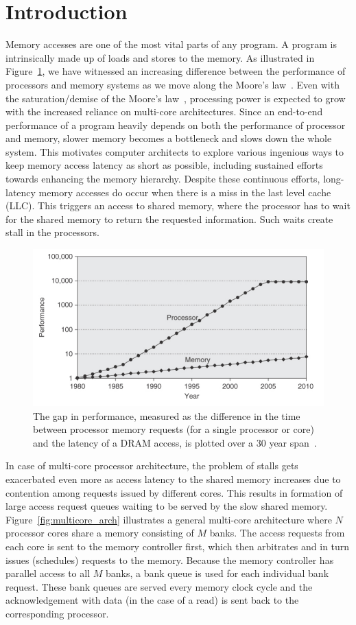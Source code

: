 \section{Introduction}
\label{sec:intro}
Memory accesses are one of the most vital parts of any program. A program is intrinsically made up of loads and stores to the memory. As illustrated in Figure~\ref{fig:cpuvsmemory}, we have witnessed an increasing difference between the performance of processors and memory systems as we move along the Moore's law~\cite{Wulf1995}.  Even with the saturation/demise of the Moore's law~\cite{waldrop2016, MooreMITR}, processing power is expected to grow with the increased reliance on multi-core architectures\cite{Geer}. Since an end-to-end performance of a program heavily depends on both the performance of processor and memory, slower memory becomes a bottleneck and slows down the whole system. {\color{red}This motivates computer architects to explore various ingenious ways to keep memory access latency as short as possible, including sustained efforts towards enhancing the memory hierarchy\cite{Burger}.} Despite these continuous efforts, long-latency memory accesses do occur when there is a miss in the last level cache (LLC). This triggers an access to shared memory, where the processor has to wait for the shared memory to return the requested information. Such waits create stall in the processors. 

\begin{figure}[t!]
\centering
\includegraphics[width=0.7\linewidth]{fig/cpuvsmemory.jpg}
\caption{The gap in performance, measured as the difference in the time 
between processor memory requests (for a single processor or core) and the 
latency of a DRAM access, is plotted over a $30$ year span~\cite{comparchbook}.}
\label{fig:cpuvsmemory}
\end{figure}
In case of multi-core processor architecture, the problem of stalls gets exacerbated even more as access latency to the 
shared memory increases due to contention among requests issued by different cores. This results in formation of large access request queues waiting to be served  by the slow shared memory. Figure~\ref{fig:multicore_arch}  illustrates a general multi-core 
architecture where $N$ processor cores share a memory consisting of $M$ banks. The access requests from each core is sent to the memory controller first, which then arbitrates and in turn issues (schedules) requests to the memory. Because the memory controller has parallel access to all $M$ banks, a bank queue is used for each individual bank request. These bank queues are 
served every memory clock cycle and the acknowledgement with data (in the case of a 
read) is sent back to the corresponding processor.

